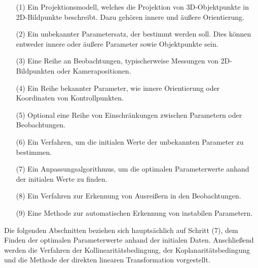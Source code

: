 \begin{itemize}
\item[(1)] Ein Projektionsmodell, welches die Projektion von 3D-Objektpunkte in 2D-Bildpunkte beschreibt. Dazu gehören innere und äußere Orientierung.

\item[(2)] Ein unbekannter Parametersatz, der bestimmt werden soll. Dies können entweder innere oder äußere Parameter sowie Objektpunkte sein.

\item[(3)] Eine Reihe an Beobachtungen, typischerweise Messungen von 2D-Bildpunkten oder Kamerapositionen.

\item[(4)] Ein Reihe bekannter Parameter, wie innere Orientierung oder Koordinaten von Kontrollpunkten.

\item[(5)] Optional eine Reihe von Einschränkungen zwischen Parametern oder Beobachtungen.

\item[(6)] Ein Verfahren, um die initialen Werte der unbekannten Parameter zu bestimmen.

\item[(7)] Ein Anpassungsalgorithmus, um die optimalen Parameterwerte anhand der initialen Werte zu finden.

\item[(8)] Ein Verfahren zur Erkennung von Ausreißern in den Beobachtungen.

\item[(9)] Eine Methode zur automatischen Erkennung von instabilen Parametern.

\end{itemize}

Die folgenden Abschnitten beziehen sich hauptsächlich auf Schritt (7), dem Finden der optimalen Parameterwerte anhand der initialen Daten. Anschließend werden die Verfahren der Kollinearitätsbedingung, der Koplanaritätsbedingung und die Methode der direkten linearen Transformation vorgestellt. 

